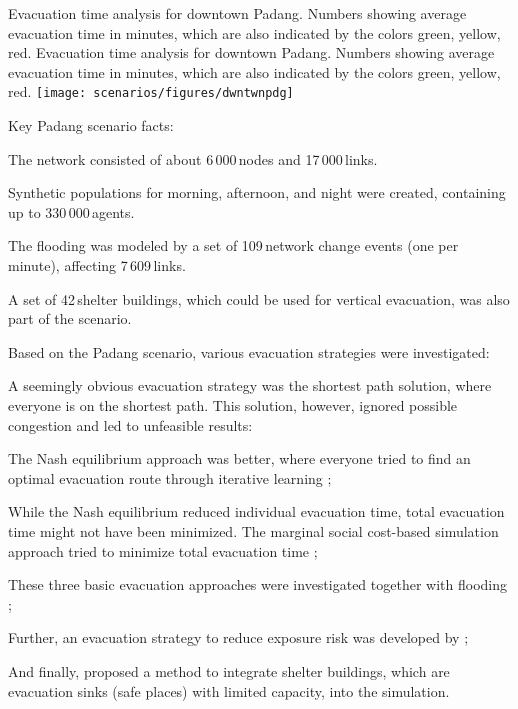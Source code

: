 %
\createfigure%
{Evacuation time analysis for downtown Padang. Numbers showing average evacuation time in minutes, which are also indicated by the colors green, yellow, red.}%
{Evacuation time analysis for downtown Padang. Numbers showing average evacuation time in minutes, which are also indicated by the colors green, yellow, red.}%
{\label{chap:using:padang}}%
{\texttt{[image: scenarios/figures/dwntwnpdg]}}%
{}

Key Padang scenario facts:
\begin{compactitem}
\item The network consisted of about 6\,000\,nodes and 17\,000\,links.
\item Synthetic populations for morning, afternoon, and night were created, containing up to 330\,000\,agents.
\item The flooding was modeled by a set of 109\,network change events (one per minute), affecting 7\,609\,links.
\item A set of 42\,shelter buildings, which could be used for vertical evacuation, was also part of the scenario.
\end{compactitem}
Based on the Padang scenario, various evacuation strategies were investigated:
\begin{compactitem}
\item A seemingly obvious evacuation strategy was the shortest path solution, where everyone is on the shortest path. This solution, however, ignored possible congestion and led to unfeasible results:
\item The Nash equilibrium approach was better, where everyone tried to find an optimal evacuation route through iterative learning \citep{00LaemmelKluepfelNagel2009EvacPadangAtBookTimmermanns};
\item While the Nash equilibrium reduced individual evacuation time, total evacuation time might not have been minimized. The marginal social cost-based simulation approach tried to minimize total evacuation time \citep{00LaemmelFloetteroed2009KISysOptEvac,00DresslerFloetteroedLaemmelNagelSkutella2010OptimalEvacuationLargeScaleScenarios};
\item These three basic evacuation approaches were investigated together with flooding \citep{00LaemmelGretherNagel2009TimeDependentNetworks,Laemmel_PhDThesis_2011};
\item Further, an evacuation strategy to reduce exposure risk was developed by \citep{00LaemmelKluepfelNagel2010PEDRiskPrinted};
\item And finally, \citet{00FloetteroedLaemmel2010ICECShelterEvac} proposed a method to integrate shelter buildings, which are evacuation sinks (\ie safe places) 
with limited capacity, into the simulation.  
\end{compactitem}

